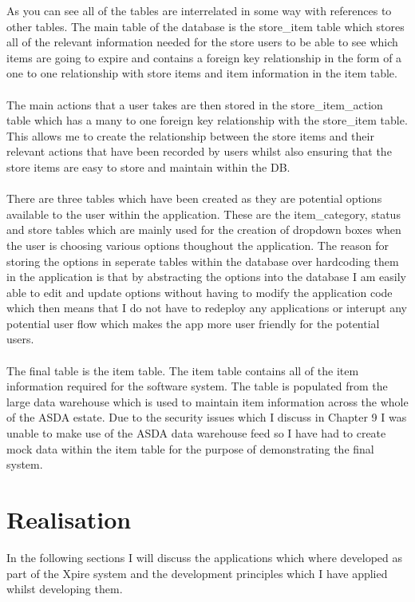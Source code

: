 \documentclass[a4paper,11pt]{report}
\begin{document}
As you can see all of the tables are interrelated in some way with references to other tables. The main table of the database is the store{\_}item table which stores all of the relevant information needed for the store users to be able to see which items are going to expire and contains a foreign key relationship in the form of a one to one relationship with store items and item information in the item table.
\\
\\
The main actions that a user takes are then stored in the store{\_}item{\_}action table which has a many to one foreign key relationship with the store{\_}item table. This allows me to create the relationship between the store items and their relevant actions that have been recorded by users whilst also ensuring that the store items are easy to store and maintain within the DB.
\\
\\
There are three tables which have been created as they are potential options available to the user within the application. These are the item{\_}category, status and store tables which are mainly used for the creation of dropdown boxes when the user is choosing various options thoughout the application. The reason for storing the options in seperate tables within the database over hardcoding them in the application is that by abstracting the options into the database I am easily able to edit and update options without having to modify the application code which then means that I do not have to redeploy any applications or interupt any potential user flow which makes the app more user friendly for the potential users.
\\
\\
The final table is the item table. The item table contains all of the item information required for the software system. The table is populated from the large data warehouse which is used to maintain item information across the whole of the ASDA estate. Due to the security issues which I discuss in Chapter 9 I was unable to make use of the ASDA data warehouse feed so I have had to create mock data within the item table for the purpose of demonstrating the final system.

\chapter{Realisation}
In the following sections I will discuss the applications which where developed as part of the Xpire system and the development principles which I have applied whilst developing them.
\end{document}
